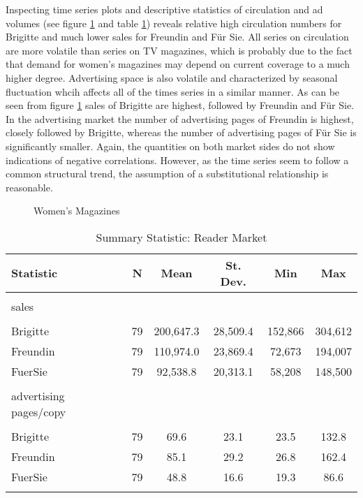 \documentclass[12pt,a4paper]{scrreprt}
\begin{document}
Inspecting time series plots and descriptive statistics of circulation and ad volumes (see figure \ref{fig_frauen} and table \ref{table_frauen}) reveals relative high circulation numbers for Brigitte and much lower sales for Freundin and Für Sie. All series on circulation are more volatile than series on TV magazines, which is probably due to the fact that demand for women's magazines may depend on current coverage to a much higher degree. Advertising space is also volatile and characterized by seasonal fluctuation whcih affects all of the times series in a similar manner.  As can be seen from figure \ref{fig_frauen} sales of Brigitte are highest, followed by Freundin and Für Sie. In the advertising market the number of advertising pages of Freundin is highest, closely followed by Brigitte, whereas the number of advertising pages of Für Sie is significantly smaller. Again, the quantities on both market sides do not show indications of negative correlations. However, as the time series seem to follow a common structural trend, the assumption of a substitutional relationship is reasonable. 


\begin{figure}[H]
\caption{Women's Magazines}
\begin{minipage}
	\centering
	
\end{minipage}
\hfil
\begin{minipage}
	\centering
	
\end{minipage}
\label{fig_frauen}
\end{figure}


\begin{table}[!htbp] \centering 
  \caption{Summary Statistic: Reader Market} 
  \label{table_frauen} 
\begin{tabular}{@{\extracolsep{5pt}}lccccc} 
\\[-1.8ex]\hline  
Statistic & \multicolumn{1}{c}{N} & \multicolumn{1}{c}{Mean} & \multicolumn{1}{c}{St. Dev.} & \multicolumn{1}{c}{Min} & \multicolumn{1}{c}{Max} \\ 
\hline \\[-1.8ex] 
sales \\
\hline \\[-1.8ex]
Brigitte & 79 & 200,647.3 & 28,509.4 & 152,866 & 304,612 \\ 
Freundin & 79 & 110,974.0 & 23,869.4 & 72,673 & 194,007 \\ 
FuerSie & 79 & 92,538.8 & 20,313.1 & 58,208 & 148,500 \\ 
\hline \\[-1.8ex] 
advertising pages/copy \\
\hline \\[-1.8ex] 
Brigitte & 79 & 69.6 & 23.1 & 23.5 & 132.8 \\ 
Freundin & 79 & 85.1 & 29.2 & 26.8 & 162.4 \\ 
FuerSie & 79 & 48.8 & 16.6 & 19.3 & 86.6 \\ 
\hline \\[-1.8ex] 
\end{tabular} 
\end{table}  
\end{document}
